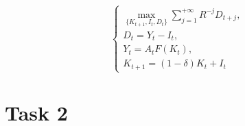 \documentclass{article}
\begin{document}
\begin{equation}
	\begin{cases}
	\max\limits_{\{K_{t+1}, I_t, D_t\}}\sum_{j=1}^{+\infty}R^{-j}D_{t+j},\\
	D_t = Y_t - I_t,\\
	Y_t = A_t F(K_t), \\
	K_{t+1} = (1-\delta)K_t + I_t
	\end{cases}
\end{equation}

\section*{Task 2} \label{sec:sec2}
\end{document}
